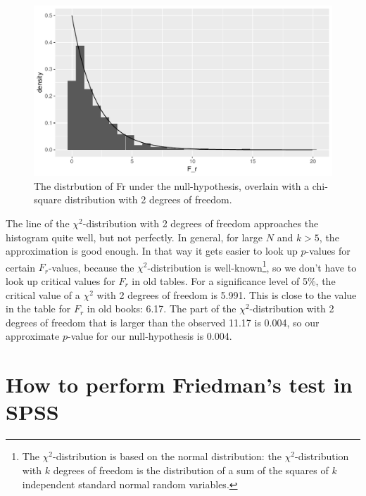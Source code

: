 \documentclass[]{book}\usepackage[]{graphicx}\usepackage[]{color}
\makeatletter
\def\maxwidth{ %
  \ifdim\Gin@nat@width>\linewidth
    \linewidth
  \else
    \Gin@nat@width
  \fi
}
\newenvironment{knitrout}{}{} %
\makeatother
\begin{document}
\begin{knitrout}
\color{fgcolor}\begin{figure}

{\centering \includegraphics[width=\maxwidth]{figure/nonparmixed_56-1} 

}

\caption[The distrbution of Fr under the null-hypothesis, overlain with a chi-square distribution with 2 degrees of freedom]{The distrbution of Fr under the null-hypothesis, overlain with a chi-square distribution with 2 degrees of freedom.}\label{fig:nonparmixed_56}
\end{figure}


\end{knitrout}

The line of the $\chi^2$-distribution with 2 degrees of freedom approaches the histogram quite well, but not perfectly. In general, for large $N$ and $k>5$, the approximation is good enough. In that way it gets easier to look up $p$-values for certain $F_r$-values, because the $\chi^2$-distribution is well-known\footnote{The $\chi^2$-distribution is based on the normal distribution: the $\chi^2$-distribution with $k$ degrees of freedom is the distribution of a sum of the squares of $k$ independent standard normal random variables.}, so we don't have to look up critical values for $F_r$ in old tables. For a significance level of 5\%, the critical value of a $\chi^2$ with 2 degrees of freedom is 5.991. This is close to the value in the table for $F_r$ in old books: 6.17. The part of the $\chi^2$-distribution with 2 degrees of freedom that is larger than the observed 11.17 is 0.004, so our approximate $p$-value for our null-hypothesis is 0.004.


\section{How to perform Friedman's test in SPSS}
\end{document}
